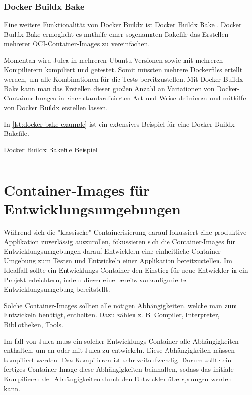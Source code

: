\subsubsection{Docker Buildx Bake}

Eine weitere Funktionalität von Docker Buildx ist Docker Buildx Bake \cite{dockerBake}. Docker Buildx Bake ermöglicht es mithilfe einer sogenannten Bakefile das Erstellen mehrerer OCI-Container-Images zu vereinfachen.

Momentan wird Julea in mehreren Ubuntu-Versionen sowie mit mehreren Kompilierern kompiliert und getestet. Somit müssten mehrere Dockerfiles ertellt werden, um alle Kombinationen für die Tests bereitzustellen. Mit Docker Buildx Bake kann man das Erstellen dieser großen Anzahl an Variationen von Docker-Container-Images in einer standardisierten Art und Weise definieren und mithilfe von Docker Buildx erstellen lassen. 

In \cref{lst:docker-bake-example} ist ein extensives Beispiel für eine Docker Buildx Bakefile.

\begin{listing}[H]
    \caption{Docker Buildx Bakefile Beispiel}
    \label{lst:docker-bake-example}
    \inputminted{./lexers/docker-bake-lexer.py}{./code-examples/docker-bake.example.hcl}
\end{listing}

\section{Container-Images für Entwicklungsumgebungen} \label{sec:bg-dev-container}

Während sich die "klassische" Containerisierung darauf fokussiert eine produktive Applikation zuverlässig auszurollen, fokussieren sich die Container-Images für Entwicklungsumgebungen darauf Entwicklern eine einheitliche Container-Umgebung zum Testen und Entwickeln einer Applikation bereitzustellen. Im Idealfall sollte ein Entwicklungs-Container den Einstieg für neue Entwickler in ein Projekt erleichtern, indem dieser eine bereits vorkonfigurierte Entwicklungsumgebung bereitstellt.

Solche Container-Images sollten alle nötigen Abhängigkeiten, welche man zum Entwickeln benötigt, enthalten. Dazu zählen z. B. Compiler, Interpreter, Bibliotheken, Tools.

Im fall von Julea muss ein solcher Entwicklungs-Container alle Abhängigkeiten enthalten, um an oder mit Julea zu entwickeln. Diese Abhängigkeiten müssen kompiliert werden. Das Kompilieren ist sehr zeitaufwendig. Darum sollte ein fertiges Container-Image diese Abhängigkeiten beinhalten, sodass das initiale Kompilieren der Abhängigkeiten durch den Entwickler übersprungen werden kann.

